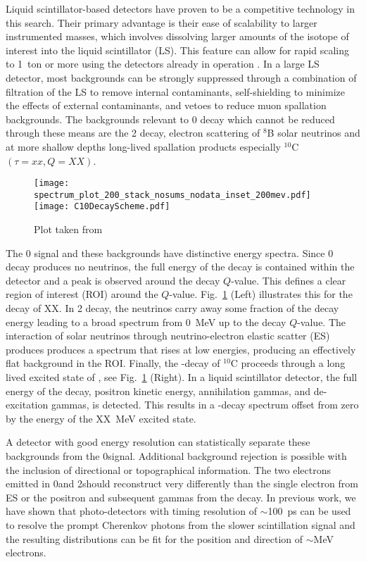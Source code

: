 Liquid scintillator-based detectors have
proven to be a competitive technology in this search\cite{KamLANDZen2013}. Their primary advantage is their ease of scalability to
larger instrumented masses, which involves dissolving larger amounts of
the isotope of interest into the liquid scintillator (LS). This
feature can allow for rapid scaling to 1~ton or more using the
detectors already in operation \cite{Biller2013}. In a large LS
detector, most backgrounds can be strongly suppressed through a
combination of filtration of the LS to remove internal contaminants,
self-shielding to minimize the effects of external contaminants, and
vetoes to reduce muon spallation backgrounds. The backgrounds relevant to
0{\nbb} decay which cannot be reduced through these means are the
2{\nbb} decay, electron scattering of $^8$B solar neutrinos and at more shallow depths long-lived spallation products especially $^{10}$C$(\tau=xx, Q=XX)$.

\begin{figure}[ht]
\centering
\texttt{[image: spectrum\_plot\_200\_stack\_nosums\_nodata\_inset\_200mev.pdf]}
\texttt{[image: C10DecayScheme.pdf]}
\caption{ Plot taken from~\cite{SNOp_paper}}
\label{fig:EdisAnd10C}
\end{figure}


The 0{\nbb} signal and these backgrounds have distinctive energy spectra. Since 0{\nbb} decay produces no neutrinos, the full energy of the
decay is contained within the detector and a peak is observed around the decay $Q$-value. This defines a clear region of interest (ROI) around the $Q$-value.  Fig.~\ref{fig:EdisAnd10C} (Left) illustrates this for the \nbb decay of XX. In 2{\nbb} decay, the neutrinos carry away some fraction of the decay energy leading to a broad spectrum from 0~MeV up to the decay $Q$-value. The interaction of \B solar neutrinos through neutrino-electron elastic scatter (ES) produces produces a spectrum that rises at low energies, producing an effectively flat background in the ROI. Finally, the \bpd-decay of $^{10}$C proceeds through a long lived excited state of \bten,  see Fig.~\ref{fig:EdisAnd10C} (Right). In a liquid scintillator detector, the full energy of the decay, positron kinetic energy, annihilation gammas, and de-excitation gammas, is detected. This results in a \bmd-decay spectrum offset from zero by the energy of the XX~MeV excited state.

A detector with good energy resolution can statistically separate these backgrounds from the 0\nbb signal. Additional background rejection is possible with the inclusion of directional or topographical information. The two electrons emitted in 0\nbb and 2\nbb should reconstruct very differently than the single electron from ES or the positron and subsequent  gammas from the \C decay. In previous work, we have shown that photo-detectors with timing resolution of $\sim$100~ps can be used to resolve the prompt Cherenkov photons from the slower scintillation signal and the resulting distributions can be fit for the position and direction of $\sim$MeV electrons\cite{Aberle2014}. 

